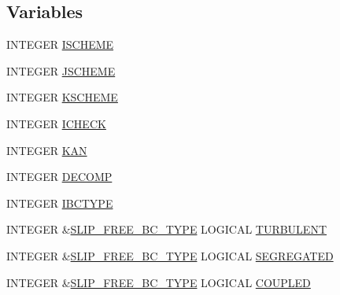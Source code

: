 \subsection*{Variables}
\begin{DoxyCompactItemize}
\item 
I\-N\-T\-E\-G\-E\-R \hyperlink{home_2abonfi_2_c_f_d__codes_2_eul_f_s_83_84_2include_2flags_8com_a2a5c33e10743241daf1d588271535cbd}{I\-S\-C\-H\-E\-M\-E}
\item 
I\-N\-T\-E\-G\-E\-R \hyperlink{home_2abonfi_2_c_f_d__codes_2_eul_f_s_83_84_2include_2flags_8com_a1083bd312818afd916c7d337fc2f522f}{J\-S\-C\-H\-E\-M\-E}
\item 
I\-N\-T\-E\-G\-E\-R \hyperlink{home_2abonfi_2_c_f_d__codes_2_eul_f_s_83_84_2include_2flags_8com_adeb56587b709e4a5e4c069fc1212f8d4}{K\-S\-C\-H\-E\-M\-E}
\item 
I\-N\-T\-E\-G\-E\-R \hyperlink{home_2abonfi_2_c_f_d__codes_2_eul_f_s_83_84_2include_2flags_8com_a820fad8822140443f9e99a14c76dc711}{I\-C\-H\-E\-C\-K}
\item 
I\-N\-T\-E\-G\-E\-R \hyperlink{home_2abonfi_2_c_f_d__codes_2_eul_f_s_83_84_2include_2flags_8com_a8ba8c3e1746d1dda10a6169c712e8471}{K\-A\-N}
\item 
I\-N\-T\-E\-G\-E\-R \hyperlink{home_2abonfi_2_c_f_d__codes_2_eul_f_s_83_84_2include_2flags_8com_a2d201f6361052b3dba0b5364e26a9321}{D\-E\-C\-O\-M\-P}
\item 
I\-N\-T\-E\-G\-E\-R \hyperlink{home_2abonfi_2_c_f_d__codes_2_eul_f_s_83_84_2include_2flags_8com_a1ab85a12f47d078d88be0df3c8e032f5}{I\-B\-C\-T\-Y\-P\-E}
\item 
I\-N\-T\-E\-G\-E\-R \&\hyperlink{home_2abonfi_2_c_f_d__codes_2_eul_f_s_83_84_2include_2flags_8com_a6beb6f16ff7301fc1f9a031b0f564045}{S\-L\-I\-P\-\_\-\-F\-R\-E\-E\-\_\-\-B\-C\-\_\-\-T\-Y\-P\-E} L\-O\-G\-I\-C\-A\-L \hyperlink{home_2abonfi_2_c_f_d__codes_2_eul_f_s_83_84_2include_2flags_8com_a874e0741db8fe8daec6f320acfeed044}{T\-U\-R\-B\-U\-L\-E\-N\-T}
\item 
I\-N\-T\-E\-G\-E\-R \&\hyperlink{home_2abonfi_2_c_f_d__codes_2_eul_f_s_83_84_2include_2flags_8com_a6beb6f16ff7301fc1f9a031b0f564045}{S\-L\-I\-P\-\_\-\-F\-R\-E\-E\-\_\-\-B\-C\-\_\-\-T\-Y\-P\-E} L\-O\-G\-I\-C\-A\-L \hyperlink{home_2abonfi_2_c_f_d__codes_2_eul_f_s_83_84_2include_2flags_8com_a130d80cc54a859d28cc70c83f2ea3b16}{S\-E\-G\-R\-E\-G\-A\-T\-E\-D}
\item 
I\-N\-T\-E\-G\-E\-R \&\hyperlink{home_2abonfi_2_c_f_d__codes_2_eul_f_s_83_84_2include_2flags_8com_a6beb6f16ff7301fc1f9a031b0f564045}{S\-L\-I\-P\-\_\-\-F\-R\-E\-E\-\_\-\-B\-C\-\_\-\-T\-Y\-P\-E} L\-O\-G\-I\-C\-A\-L \hyperlink{home_2abonfi_2_c_f_d__codes_2_eul_f_s_83_84_2include_2flags_8com_ab547235acca8df0c0afedd7ec0e93f24}{C\-O\-U\-P\-L\-E\-D}

\end{DoxyCompactItemize}

